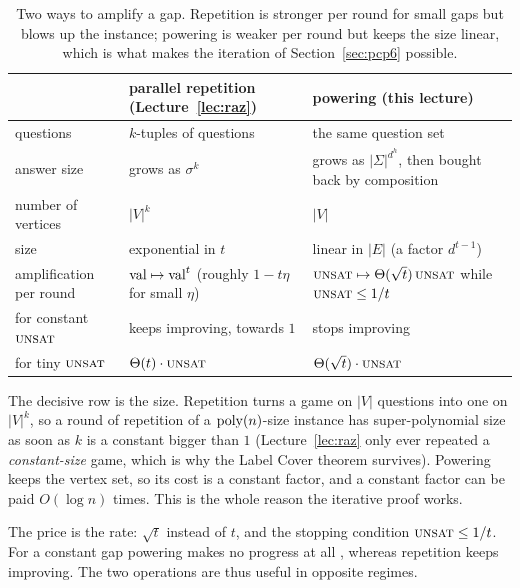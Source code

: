 \begin{table}[t]
\centering\small
\renewcommand{\arraystretch}{1.25}
\begin{tabular}{@{}l>{\raggedright\arraybackslash}p{4.4cm}>{\raggedright\arraybackslash}p{5.0cm}@{}}
\toprule
& parallel repetition (Lecture~\ref{lec:raz}) & powering (this lecture)\\
\midrule
questions & $k$-tuples of questions & the same question set\\
answer size & grows as $\sigma^{k}$ & grows as $|\Sigma|^{d^{h}}$, then bought back by composition\\
number of vertices & $|V|^{k}$ & $|V|$\\
size & exponential in $t$ & linear in $|E|$ (a factor $d^{t-1}$)\\
amplification per round & $\operatorname{val}\mapsto\operatorname{val}^{t}$ (roughly $1-t\eta$ for small $\eta$) & $\textsc{unsat}\mapsto\Theta(\sqrt t)\,\textsc{unsat}$ while $\textsc{unsat}\le1/t$\\
for constant $\textsc{unsat}$ & keeps improving, towards $1$ & stops improving \citep{Bogdanov05}\\
for tiny $\textsc{unsat}$ & $\Theta(t)\cdot\textsc{unsat}$ \citep[Section~9]{Dinur07} & $\Theta(\sqrt t)\cdot\textsc{unsat}$\\
\bottomrule
\end{tabular}
\caption{Two ways to amplify a gap.  Repetition is stronger per round for small gaps but blows up the instance; powering is weaker per round but keeps the size linear, which is what makes the iteration of Section~\ref{sec:pcp6} possible.}
\label{tab:amp-vs-rep}
\end{table}

\noindent
The decisive row is the size.  Repetition turns a game on $|V|$ questions into one on $|V|^k$, so a round of repetition of a $\operatorname{poly}(n)$-size instance has super-polynomial size as soon as $k$ is a constant bigger than $1$ (Lecture~\ref{lec:raz} only ever repeated a \emph{constant-size} game, which is why the Label Cover theorem survives).
Powering keeps the vertex set, so its cost is a constant factor, and a constant factor can be paid $O(\log n)$ times.  This is the whole reason the iterative proof works.

The price is the rate: $\sqrt t$ instead of $t$, and the stopping condition $\textsc{unsat}\le1/t$.  For a constant gap powering makes no progress at all \citep{Bogdanov05}, whereas repetition keeps improving.  The two operations are thus useful in opposite regimes.

